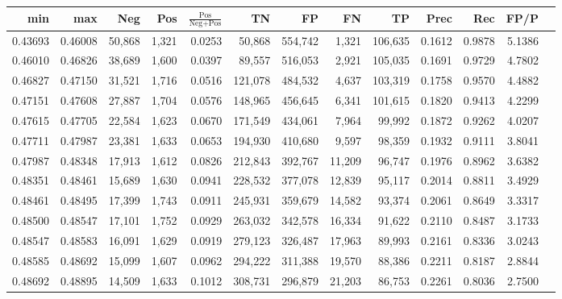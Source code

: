 \begin{tabular}{rrrrrrrrrrrrr}
\toprule
    min &     max &    Neg &   Pos & $\frac{\text{Pos}}{\text{Neg}+\text{Pos}}$ &      TN &      FP &      FN &      TP &   Prec &    Rec &   FP/P \\
\midrule
0.43693 & 0.46008 & 50,868 & 1,321 &                                     0.0253 &  50,868 & 554,742 &   1,321 & 106,635 & 0.1612 & 0.9878 & 5.1386 \\
0.46010 & 0.46826 & 38,689 & 1,600 &                                     0.0397 &  89,557 & 516,053 &   2,921 & 105,035 & 0.1691 & 0.9729 & 4.7802 \\
0.46827 & 0.47150 & 31,521 & 1,716 &                                     0.0516 & 121,078 & 484,532 &   4,637 & 103,319 & 0.1758 & 0.9570 & 4.4882 \\
0.47151 & 0.47608 & 27,887 & 1,704 &                                     0.0576 & 148,965 & 456,645 &   6,341 & 101,615 & 0.1820 & 0.9413 & 4.2299 \\
0.47615 & 0.47705 & 22,584 & 1,623 &                                     0.0670 & 171,549 & 434,061 &   7,964 &  99,992 & 0.1872 & 0.9262 & 4.0207 \\
0.47711 & 0.47987 & 23,381 & 1,633 &                                     0.0653 & 194,930 & 410,680 &   9,597 &  98,359 & 0.1932 & 0.9111 & 3.8041 \\
0.47987 & 0.48348 & 17,913 & 1,612 &                                     0.0826 & 212,843 & 392,767 &  11,209 &  96,747 & 0.1976 & 0.8962 & 3.6382 \\
0.48351 & 0.48461 & 15,689 & 1,630 &                                     0.0941 & 228,532 & 377,078 &  12,839 &  95,117 & 0.2014 & 0.8811 & 3.4929 \\
0.48461 & 0.48495 & 17,399 & 1,743 &                                     0.0911 & 245,931 & 359,679 &  14,582 &  93,374 & 0.2061 & 0.8649 & 3.3317 \\
0.48500 & 0.48547 & 17,101 & 1,752 &                                     0.0929 & 263,032 & 342,578 &  16,334 &  91,622 & 0.2110 & 0.8487 & 3.1733 \\
0.48547 & 0.48583 & 16,091 & 1,629 &                                     0.0919 & 279,123 & 326,487 &  17,963 &  89,993 & 0.2161 & 0.8336 & 3.0243 \\
0.48585 & 0.48692 & 15,099 & 1,607 &                                     0.0962 & 294,222 & 311,388 &  19,570 &  88,386 & 0.2211 & 0.8187 & 2.8844 \\
0.48692 & 0.48895 & 14,509 & 1,633 &                                     0.1012 & 308,731 & 296,879 &  21,203 &  86,753 & 0.2261 & 0.8036 & 2.7500 \\

\end{tabular}
